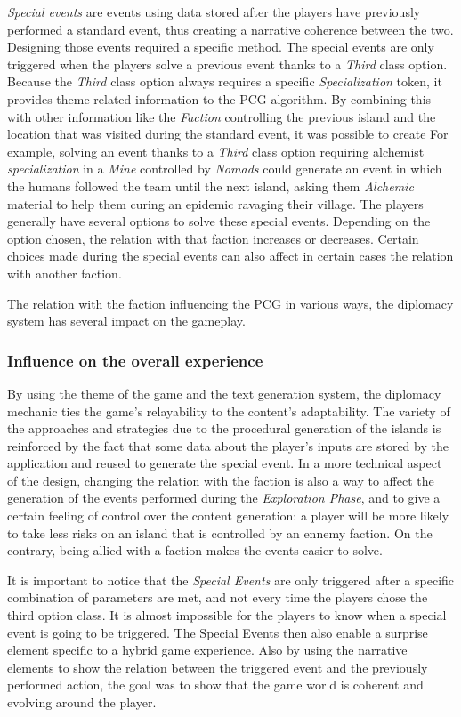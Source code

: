 \textit{Special events} are events using data stored after the players have previously performed a standard event, thus creating a narrative coherence between the two. Designing those events required a specific method. The special events are only triggered when the players solve a previous event thanks to a \textit{Third} class option. Because the \textit{Third} class option always requires a specific \textit{Specialization} token, it provides theme related information to the PCG algorithm. By combining this with other information like the \textit{Faction} controlling the previous island and the location that was visited during the standard event, it was possible to create  For example, solving an event thanks to a \textit{Third} class option requiring  alchemist \textit{specialization} in a \textit{Mine} controlled by \textit{Nomads} could generate an event in which the humans followed the team until the next island, asking them \textit{Alchemic} material to help them curing an epidemic ravaging their village. The players generally have several options to solve these special events. Depending on the option chosen, the relation with that faction increases or decreases. Certain choices made during the special events can also affect in certain cases the relation with another faction.

The relation with the faction influencing the PCG in various ways, the diplomacy system has several impact on the gameplay. 
\subsubsection{Influence on the overall experience}
By using the theme of the game and the text generation system, the diplomacy mechanic ties the game's relayability to the content's adaptability. The variety of the approaches and strategies due to the procedural generation of the islands is reinforced by the fact that some data about the player's inputs are stored by the application and reused to generate the special event. 
In a more technical aspect of the design, changing the relation with the faction is also a way to affect the generation of the events performed during the \textit{Exploration Phase}, and to give a certain feeling of control over the content generation: a player will be more likely to take less risks on an island that is controlled by an ennemy faction. On the contrary, being allied with a faction makes the events easier to solve.

It is important to notice that the \textit{Special Events} are only triggered after a specific combination of parameters are met, and not every time the players chose the third option class. It is almost impossible for the players to know when a special event is going to be triggered. The Special Events then also enable a surprise element specific to a hybrid game experience. Also by using the narrative elements to show the relation between the triggered event and the previously performed action, the goal was to show that the game world is coherent and evolving around the player. 
